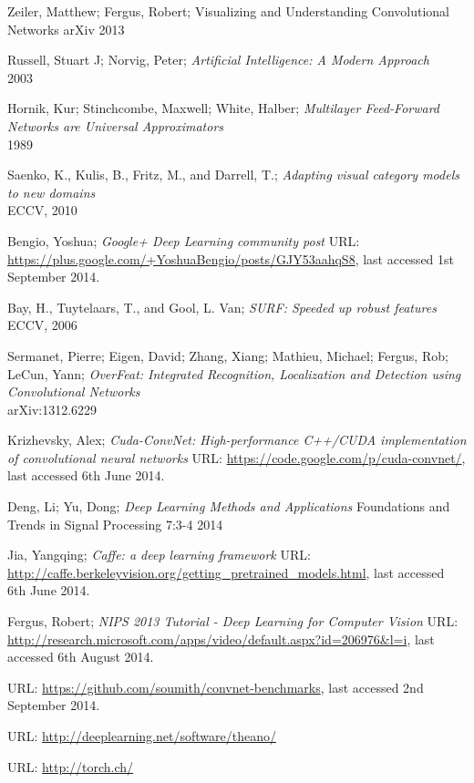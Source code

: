 \documentclass[a4paper,11pt]{article}
\begin{document}
\begin{thebibliography}{1}
 Zeiler, Matthew; Fergus, Robert;
 Visualizing and Understanding Convolutional Networks
 arXiv 2013


 Russell, Stuart J; Norvig, Peter;
 \emph{Artificial Intelligence: A Modern Approach}\\
 2003

 Hornik, Kur; Stinchcombe, Maxwell; White, Halber;
 \emph{Multilayer Feed-Forward Networks are Universal Approximators}\\
 1989

 Saenko, K., Kulis, B., Fritz, M., and Darrell, T.;
 \emph{Adapting visual category models to new domains}\\
 ECCV, 2010

 Bengio, Yoshua;
 \emph{Google+ Deep Learning community post}
 URL: \url{https://plus.google.com/+YoshuaBengio/posts/GJY53aahqS8}, last accessed 1st September 2014.
 
 Bay, H., Tuytelaars, T., and Gool, L. Van;
 \emph{SURF: Speeded up robust features}\\
 ECCV, 2006

 Sermanet, Pierre; Eigen, David; Zhang, Xiang; Mathieu, Michael; Fergus, Rob; LeCun, Yann;
 \emph{OverFeat: Integrated Recognition, Localization and Detection using Convolutional Networks}\\
 arXiv:1312.6229
   
 Krizhevsky, Alex; 
 \emph{Cuda-ConvNet: High-performance C++/CUDA implementation of convolutional neural networks}
 URL: \url{https://code.google.com/p/cuda-convnet/}, last accessed 6th June 2014.
 
 Deng, Li; Yu, Dong;
 \emph{Deep Learning Methods and Applications}
 Foundations and Trends in Signal Processing
 7:3-4 2014

 Jia, Yangqing;
 \emph{Caffe: a deep learning framework} 
 URL: \url{http://caffe.berkeleyvision.org/getting_pretrained_models.html}, last accessed 6th June 2014.

 Fergus, Robert;
 \emph{NIPS 2013 Tutorial - Deep Learning for Computer Vision}
 URL: \url{http://research.microsoft.com/apps/video/default.aspx?id=206976&l=i}, last accessed 6th August 2014.

 URL: \url{https://github.com/soumith/convnet-benchmarks}, last accessed 2nd September 2014.
 
 URL: \url{http://deeplearning.net/software/theano/}
 
 URL: \url{http://torch.ch/} 

\end{thebibliography}
\end{document}
